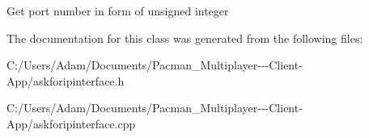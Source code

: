 Get port number in form of unsigned integer 

The documentation for this class was generated from the following files\+:\begin{DoxyCompactItemize}
\item 
C\+:/\+Users/\+Adam/\+Documents/\+Pacman\+\_\+\+Multiplayer-\/-\/-\/\+Client-\/\+App/askforipinterface.\+h\item 
C\+:/\+Users/\+Adam/\+Documents/\+Pacman\+\_\+\+Multiplayer-\/-\/-\/\+Client-\/\+App/askforipinterface.\+cpp\end{DoxyCompactItemize}
